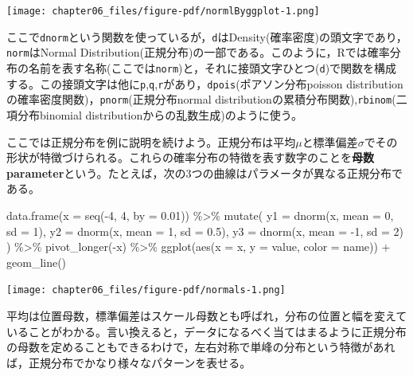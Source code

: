 \documentclass[
  a4paper,
]{ltjsbook}
\newenvironment{Shaded}{\begin{snugshade}}{\end{snugshade}}
\newcommand{\AttributeTok}[1]{\textcolor[rgb]{0.40,0.45,0.13}{#1}}
\newcommand{\DecValTok}[1]{\textcolor[rgb]{0.68,0.00,0.00}{#1}}
\newcommand{\FloatTok}[1]{\textcolor[rgb]{0.68,0.00,0.00}{#1}}
\newcommand{\FunctionTok}[1]{\textcolor[rgb]{0.28,0.35,0.67}{#1}}
\newcommand{\NormalTok}[1]{\textcolor[rgb]{0.00,0.23,0.31}{#1}}
\newcommand{\SpecialCharTok}[1]{\textcolor[rgb]{0.37,0.37,0.37}{#1}}
\begin{document}
\texttt{[image: chapter06\_files/figure-pdf/normlByggplot-1.png]}

ここで\texttt{dnorm}という関数を使っているが，\texttt{d}はDensity(確率密度)の頭文字であり，\texttt{norm}はNormal
Distribution(正規分布)の一部である。このように，Rでは確率分布の名前を表す名称(ここでは\texttt{norm})と，それに接頭文字ひとつ(\texttt{d})で関数を構成する。この接頭文字は他に\texttt{p},\texttt{q},\texttt{r}があり，\texttt{dpois}(ポアソン分布poisson
distributionの確率密度関数)，\texttt{pnorm}(正規分布normal
distributionの累積分布関数),\texttt{rbinom}(二項分布binomial
distributionからの乱数生成)のように使う。

ここでは正規分布を例に説明を続けよう。正規分布は平均\(\mu\)と標準偏差\(\sigma\)でその形状が特徴づけられる。これらの確率分布の特徴を表す数字のことを\textbf{母数
parameter}という。たとえば，次の3つの曲線はパラメータが異なる正規分布である。

\begin{Shaded}
\begin{Highlighting}[]
\FunctionTok{data.frame}\NormalTok{(}\AttributeTok{x =} \FunctionTok{seq}\NormalTok{(}\SpecialCharTok{{-}}\DecValTok{4}\NormalTok{, }\DecValTok{4}\NormalTok{, }\AttributeTok{by =} \FloatTok{0.01}\NormalTok{)) }\SpecialCharTok{\%\textgreater{}\%}
  \FunctionTok{mutate}\NormalTok{(}
    \AttributeTok{y1 =} \FunctionTok{dnorm}\NormalTok{(x, }\AttributeTok{mean =} \DecValTok{0}\NormalTok{, }\AttributeTok{sd =} \DecValTok{1}\NormalTok{),}
    \AttributeTok{y2 =} \FunctionTok{dnorm}\NormalTok{(x, }\AttributeTok{mean =} \DecValTok{1}\NormalTok{, }\AttributeTok{sd =} \FloatTok{0.5}\NormalTok{),}
    \AttributeTok{y3 =} \FunctionTok{dnorm}\NormalTok{(x, }\AttributeTok{mean =} \SpecialCharTok{{-}}\DecValTok{1}\NormalTok{, }\AttributeTok{sd =} \DecValTok{2}\NormalTok{)}
\NormalTok{  ) }\SpecialCharTok{\%\textgreater{}\%}
  \FunctionTok{pivot\_longer}\NormalTok{(}\SpecialCharTok{{-}}\NormalTok{x) }\SpecialCharTok{\%\textgreater{}\%}
  \FunctionTok{ggplot}\NormalTok{(}\FunctionTok{aes}\NormalTok{(}\AttributeTok{x =}\NormalTok{ x, }\AttributeTok{y =}\NormalTok{ value, }\AttributeTok{color =}\NormalTok{ name)) }\SpecialCharTok{+}
  \FunctionTok{geom\_line}\NormalTok{()}
\end{Highlighting}
\end{Shaded}

\texttt{[image: chapter06\_files/figure-pdf/normals-1.png]}

平均は位置母数，標準偏差はスケール母数とも呼ばれ，分布の位置と幅を変えていることがわかる。言い換えると，データになるべく当てはまるように正規分布の母数を定めることもできるわけで，左右対称で単峰の分布という特徴があれば，正規分布でかなり様々なパターンを表せる。
\end{document}
